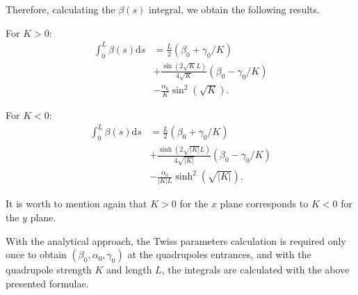 Therefore, calculating the $\beta(s)$ integral, we obtain the following results.

For $K > 0$:
\begin{align*}
    \int_{0}^{L} \beta(s) \mathrm{d}s &= \frac{L}{2}\left(\beta_0 + \gamma_0/K\right) \\
    &+ \frac{\sin\left(2\sqrt{K}L\right)}{4 \sqrt{K}}\left(\beta_0 - \gamma_0/K\right) \\
    &- \frac{\alpha_0}{K}\sin^2\left(\sqrt{K}\right).
\end{align*}

For $K < 0$:
\begin{align*}
    \int_{0}^{L} \beta(s) \mathrm{d}s &= \frac{L}{2}\left(\beta_0 + \gamma_0/K\right)  \\ 
    &+ \frac{\sinh\left(2\sqrt{|K|}L\right)}{4 \sqrt{|K|}}\left(\beta_0 - \gamma_0/K\right) \\
    &- \frac{\alpha_0}{|K|L}\sinh^2\left(\sqrt{|K|}\right).
\end{align*}

It is worth to mention again that $K > 0$ for the $x$ plane corresponds to $K < 0$ for the $y$ plane. 

With the analytical approach, the Twiss parameters calculation is required only once to obtain $(\beta_0, \alpha_0, \gamma_0)$ at the quadrupoles entrances, and with the quadrupole strength $K$ and length $L$, the integrals are calculated with the above presented formulae.
